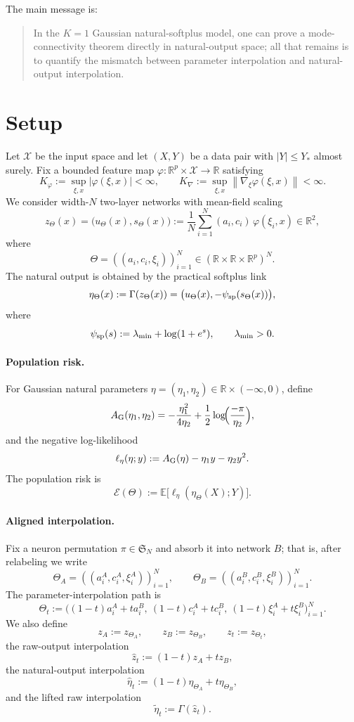 \documentclass[11pt]{article}
\theoremstyle{definition}
\newcommand{\R}{\mathbb{R}}
\newcommand{\E}{\mathbb{E}}
\newcommand{\norm}[1]{\left\lVert #1 \right\rVert}
\newcommand{\mc}[1]{\mathcal{#1}}
\newcommand{\cE}{\mathcal{E}}
\begin{document}
The main message is:
\begin{quote}
In the $K=1$ Gaussian natural-softplus model, one can prove a mode-connectivity
theorem directly in
natural-output space; all that remains is to quantify the mismatch between
parameter interpolation and natural-output interpolation.
\end{quote}

\section{Setup}

Let $\mc{X}$ be the input space and let $(X,Y)$ be a data pair with
$|Y|\le Y_\ast$ almost surely. Fix a bounded feature map
$\varphi:\R^p\times\mc{X}\to\R$ satisfying
\[
  K_\varphi:=\sup_{\xi,x}|\varphi(\xi,x)|<\infty,
  \qquad
  K_{\nabla}:=\sup_{\xi,x}\norm{\nabla_\xi\varphi(\xi,x)}<\infty.
\]
We consider width-$N$ two-layer networks with mean-field scaling
\[
  z_\Theta(x)
  =
  \bigl(u_\Theta(x),s_\Theta(x)\bigr)
  :=
  \frac1N\sum_{i=1}^N (a_i,c_i)\,\varphi(\xi_i,x)
  \in \R^2,
\]
where
\[
  \Theta=((a_i,c_i,\xi_i))_{i=1}^N \in (\R\times\R\times\R^p)^N.
\]
The natural output is obtained by the practical softplus link
\[
  \eta_\Theta(x)
  :=
  \Gamma(z_\Theta(x))
  =
  \bigl(u_\Theta(x),-\psi_{\rm sp}(s_\Theta(x))\bigr),
\]
where
\[
  \psi_{\rm sp}(s):=\lambda_{\min}+\log(1+e^s),
  \qquad
  \lambda_{\min}>0.
\]

\paragraph{Population risk.}
For Gaussian natural parameters
$\eta=(\eta_1,\eta_2)\in \R\times(-\infty,0)$, define
\[
  A_{\rm G}(\eta_1,\eta_2)
  =
  -\frac{\eta_1^2}{4\eta_2}
  + \frac12\log\!\Bigl(\frac{-\pi}{\eta_2}\Bigr),
\]
and the negative log-likelihood
\[
  \ell_\eta(\eta;y)
  :=
  A_{\rm G}(\eta) - \eta_1 y - \eta_2 y^2.
\]
The population risk is
\[
  \cE(\Theta)
  :=
  \E\big[\ell_\eta(\eta_\Theta(X);Y)\big].
\]

\paragraph{Aligned interpolation.}
Fix a neuron permutation $\pi\in\mathfrak S_N$ and absorb it into network $B$;
that is, after relabeling we write
\[
  \Theta_A=((a_i^A,c_i^A,\xi_i^A))_{i=1}^N,
  \qquad
  \Theta_B=((a_i^B,c_i^B,\xi_i^B))_{i=1}^N.
\]
The parameter-interpolation path is
\[
  \Theta_t
  :=
  \bigl((1-t)a_i^A+ta_i^B,\ (1-t)c_i^A+tc_i^B,\ (1-t)\xi_i^A+t\xi_i^B\bigr)_{i=1}^N.
\]
We also define
\[
  z_A:=z_{\Theta_A},
  \qquad
  z_B:=z_{\Theta_B},
  \qquad
  z_t:=z_{\Theta_t},
\]
the raw-output interpolation
\[
  \hat z_t := (1-t)z_A + tz_B,
\]
the natural-output interpolation
\[
  \hat\eta_t := (1-t)\eta_{\Theta_A} + t\eta_{\Theta_B},
\]
and the lifted raw interpolation
\[
  \tilde\eta_t := \Gamma(\hat z_t).
\]
\end{document}

